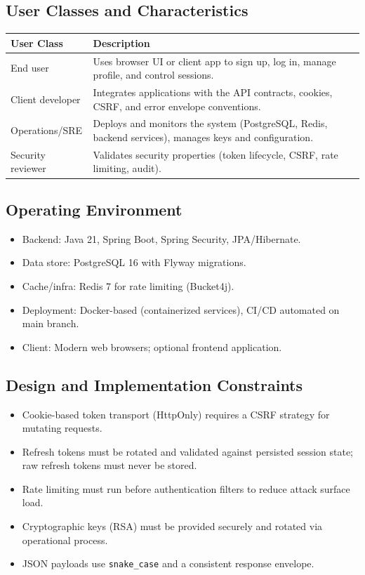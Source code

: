 \documentclass[11pt]{article}
\begin{document}
    \subsection{User Classes and Characteristics}
    \begin{tabularx}{\textwidth}{@{}lX@{}}
\toprule
\textbf{User Class} & \textbf{Description} \\
\midrule
End user & Uses browser UI or client app to sign up, log in, manage profile, and control sessions. \\
Client developer & Integrates applications with the API contracts, cookies, CSRF, and error envelope conventions. \\
Operations/SRE & Deploys and monitors the system (PostgreSQL, Redis, backend services), manages keys and configuration. \\
Security reviewer & Validates security properties (token lifecycle, CSRF, rate limiting, audit). \\
\bottomrule
    \end{tabularx}

    \subsection{Operating Environment}
    \begin{itemize}
        \item Backend: Java 21, Spring Boot, Spring Security, JPA/Hibernate.
        \item Data store: PostgreSQL 16 with Flyway migrations.
        \item Cache/infra: Redis 7 for rate limiting (Bucket4j).
        \item Deployment: Docker-based (containerized services), CI/CD automated on main branch.
        \item Client: Modern web browsers; optional frontend application.
    \end{itemize}

    \subsection{Design and Implementation Constraints}
    \begin{itemize}
        \item Cookie-based token transport (HttpOnly) requires a CSRF strategy for mutating requests.
        \item Refresh tokens must be rotated and validated against persisted session state; raw refresh tokens must never be stored.
        \item Rate limiting must run before authentication filters to reduce attack surface load.
        \item Cryptographic keys (RSA) must be provided securely and rotated via operational process.
        \item JSON payloads use \texttt{snake\_case} and a consistent response envelope.
    \end{itemize}
\end{document}
